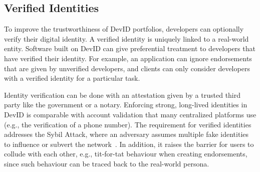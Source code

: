 \subsection{Verified Identities}
\label{subsec:strong_identities}
To improve the trustworthiness of DevID portfolios, developers can optionally verify their digital identity.
A verified identity is uniquely linked to a real-world entity.
Software built on DevID can give preferential treatment to developers that have verified their identity.
For example, an application can ignore endorsements that are given by unverified developers, and clients can only consider developers with a verified identity for a particular task.

Identity verification can be done with an attestation given by a trusted third party like the government or a notary.
Enforcing strong, long-lived identities in DevID is comparable with account validation that many centralized platforms use (e.g., the verification of a phone number).
The requirement for verified identities addresses the Sybil Attack, where an adversary assumes multiple fake identities to influence or subvert the network~\cite{douceur2002sybil}.
In addition, it raises the barrier for users to collude with each other, e.g., tit-for-tat behaviour when creating endorsements, since such behaviour can be traced back to the real-world persona.

